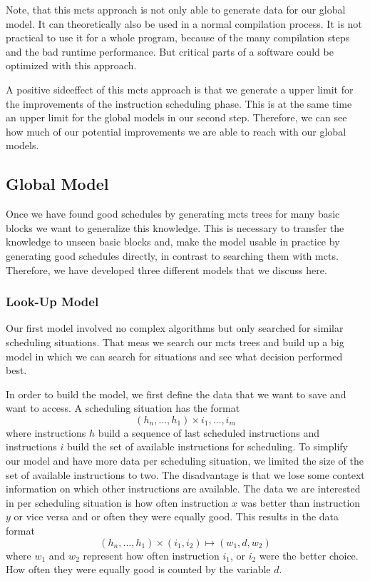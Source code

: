 Note, that this \ac{mcts} approach is not only able to generate data for our global model.
It can theoretically also be used in a normal compilation process.
It is not practical to use it for a whole program, because of the many compilation steps and the bad runtime performance.
But critical parts of a software could be optimized with this approach.

A positive sideeffect of this \ac{mcts} approach is that we generate a upper limit for the improvements of the instruction scheduling phase.
This is at the same time an upper limit for the global models in our second step.
Therefore, we can see how much of our potential improvements we are able to reach with our global models.

\subsection{Global Model}
\label{subsec:approach:ml:global}
Once we have found good schedules by generating \ac{mcts} trees for many basic blocks we want to generalize this knowledge.
This is necessary to transfer the knowledge to unseen basic blocks and, make the model usable in practice by generating good schedules directly, in contrast to searching them with \ac{mcts}.
Therefore, we have developed three different models that we discuss here.

\subsubsection{Look-Up Model}
Our first model involved no complex algorithms but only searched for similar scheduling situations.
That meas we search our \ac{mcts} trees and build up a big model in which we can search for situations and see what decision performed best.

In order to build the model, we first define the data that we want to save and want to access.
A scheduling situation has the format
\begin{equation}
    (h_n, \ldots, h_1) \times {i_1, \ldots, i_m}
    \label{eqn:approach:example-scheduling-situation}
\end{equation}
where instructions $h$ build a sequence of last scheduled instructions and instructions $i$ build the set of available instructions for scheduling.
To simplify our model and have more data per scheduling situation, we limited the size of the set of available instructions to two.
The disadvantage is that we lose some context information on which other instructions are available.
The data we are interested in per scheduling situation is how often instruction $x$ was better than instruction $y$ or vice versa and or often they were equally good.
This results in the data format
\begin{equation}
    (h_n, \ldots, h_1) \times (i_1, i_2) \mapsto (w_1, d, w_2)
\end{equation}
where $w_1$ and $w_2$ represent how often instruction $i_1$, or $i_2$ were the better choice.
How often they were equally good is counted by the variable $d$.

